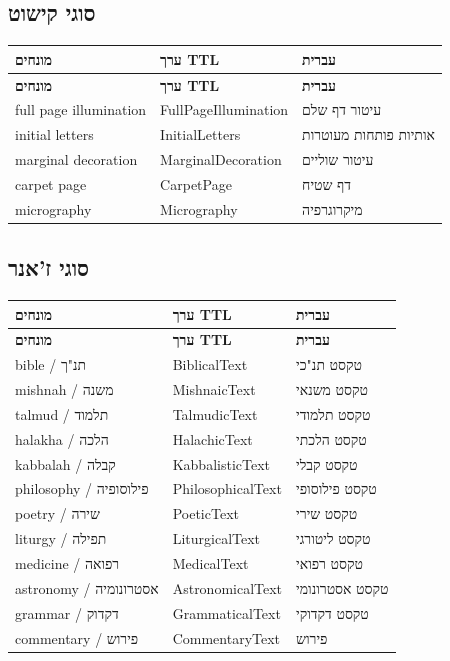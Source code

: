\documentclass[12pt,a4paper]{article}
\begin{document}
\subsection{סוגי קישוט}

\begin{longtable}{|p{4cm}|L{5cm}|L{7cm}|}
\hline
\textbf{מונחים} & \textbf{ערך TTL} & \textbf{עברית} \\
\hline
\endfirsthead
\hline
\textbf{מונחים} & \textbf{ערך TTL} & \textbf{עברית} \\
\hline
\endhead
\hline
\endfoot
full page illumination & FullPageIllumination & עיטור דף שלם \\
\hline
initial letters & InitialLetters & אותיות פותחות מעוטרות \\
\hline
marginal decoration & MarginalDecoration & עיטור שוליים \\
\hline
carpet page & CarpetPage & דף שטיח \\
\hline
micrography & Micrography & מיקרוגרפיה \\
\hline
\end{longtable}

\subsection{סוגי ז'אנר}

\begin{longtable}{|p{4cm}|L{5cm}|L{7cm}|}
\hline
\textbf{מונחים} & \textbf{ערך TTL} & \textbf{עברית} \\
\hline
\endfirsthead
\hline
\textbf{מונחים} & \textbf{ערך TTL} & \textbf{עברית} \\
\hline
\endhead
\hline
\endfoot
bible / תנ"ך & BiblicalText & טקסט תנ"כי \\
\hline
mishnah / משנה & MishnaicText & טקסט משנאי \\
\hline
talmud / תלמוד & TalmudicText & טקסט תלמודי \\
\hline
halakha / הלכה & HalachicText & טקסט הלכתי \\
\hline
kabbalah / קבלה & KabbalisticText & טקסט קבלי \\
\hline
philosophy / פילוסופיה & PhilosophicalText & טקסט פילוסופי \\
\hline
poetry / שירה & PoeticText & טקסט שירי \\
\hline
liturgy / תפילה & LiturgicalText & טקסט ליטורגי \\
\hline
medicine / רפואה & MedicalText & טקסט רפואי \\
\hline
astronomy / אסטרונומיה & AstronomicalText & טקסט אסטרונומי \\
\hline
grammar / דקדוק & GrammaticalText & טקסט דקדוקי \\
\hline
commentary / פירוש & CommentaryText & פירוש \\
\hline
\end{longtable}
\end{document}
